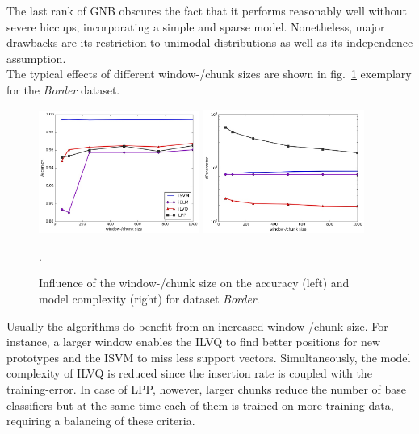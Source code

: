 \documentclass{esann}
\begin{document}
The last rank of GNB obscures the fact that it performs reasonably well without severe hiccups, incorporating a simple and sparse model. Nonetheless, major drawbacks are its restriction to unimodal distributions as well as its independence assumption.\\
The typical effects of different window-/chunk sizes are shown in fig.\ \ref{fig:chunkSize} exemplary for the \textit{Border} dataset. 
\begin{figure}
        \centering
        \includegraphics[width=0.47\textwidth]{Images/borderOriginal_random_None_testAccuraciesChunkSizes.jpg}
        \includegraphics[width=0.47\textwidth]{Images/borderOriginal_random_None_complexityNumParamMetricChunkSizes.jpg}
        \caption{Influence of the window-/chunk size on the accuracy (left) and model complexity (right) for dataset \textit{Border}.}.
        \label{fig:chunkSize}
\end{figure}
Usually the algorithms do benefit from an increased window-/chunk size. For instance, a larger window enables the ILVQ to find better positions for new prototypes and the ISVM to miss less support vectors. 
Simultaneously, the model complexity of ILVQ is reduced since the insertion rate is coupled with the training-error. 
In case of LPP, however, larger chunks reduce the number of base classifiers but at the same time each of them is trained on more training data, requiring a balancing of these criteria.
\end{document}
